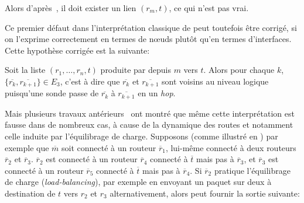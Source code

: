 Alors d'après~, il doit exister un lien $(r_m, t)$,
ce qui n'est pas vrai.


Ce premier défaut dans l'interprétation classique de \traceroute peut toutefois
être corrigé, si on l'exprime correctement en termes de n\oe{}uds \LLL plutôt qu'en
termes d'interfaces. Cette hypothèse corrigée est la suivante:

\begin{hypothese} Soit la
liste $(r_1, \ldots, r_n, t)$ produite par \traceroute depuis $m$ vers $t$.
Alors pour chaque $k$, $\{\overline{r_k},\overline{r_{k+1}}\} \in E_3$, c'est à
dire que $\overline{r_k}$ et $\overline{r_{k+1}}$ sont voisins au niveau logique
puisqu'une sonde passe de $\overline{r_k}$ à $\overline{r_{k+1}}$ en un {\em
hop}.
\label{hyp:traceroute-classique-corr}
\end{hypothese}

Mais plusieurs travaux
antérieurs~\cite{paristraceroute,willinger,SherwoodBS08,SpringMWA04,VigerACMLFT08,AugustinCOVFLMT06}
ont montré que même cette interprétation est fausse dans de nombreux cas, à
cause de la dynamique des routes et notamment celle induite par l'équilibrage de
charge.
Supposons (comme illustré en ) par exemple que
${\overline m}$ soit connecté à un routeur ${\overline r_1}$, lui-même connecté
à deux routeurs ${\overline r_2}$ et ${\overline r_3}$.
${\overline r_2}$ est connecté à un routeur ${\overline r_4}$ connecté à
$\overline{t}$ mais pas à ${\overline r_3}$, et ${\overline r_3}$ est connecté à
un routeur ${\overline r_5}$ connecté à ${\overline t}$ mais pas à ${\overline r_4}$. Si
${\overline r_2}$ pratique l'équilibrage de charge ({\em load-balancing}), par
exemple en envoyant un paquet sur deux à destination de $t$ vers $r_2$ et $r_3$
alternativement, alors \traceroute peut fournir la sortie suivante:

